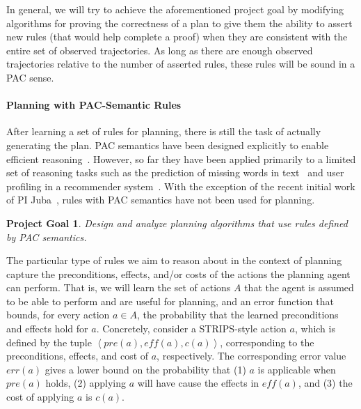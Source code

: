 \documentclass[12pt]{article}
\newcommand{\note}[1]{\textbf{\textit{#1}}}
\newcommand{\tuple}[1]{\ensuremath{\left \langle #1 \right \rangle }}
\newcommand{\eff}{\textit{eff}}
\newcommand{\pre}{\textit{pre}}
\newtheorem{problem}{Project Goal}
\begin{document}
In general, we will try to achieve the aforementioned project goal by modifying algorithms for proving the correctness of a plan to give them the ability to assert new rules (that would help complete a proof) when they are consistent with the entire set of observed trajectories. As long as there are enough observed trajectories relative to the number of asserted rules, these rules will be sound in a PAC sense. 




\paragraph{Planning with PAC-Semantic Rules}


After learning a set of rules for planning, there is still the task of actually generating the plan. PAC semantics have been designed explicitly to enable efficient reasoning~\cite{valiant2000robustLogics}. However, so far they have been applied primarily to a limited set of reasoning tasks such as the prediction of missing words in text~\cite{michael2008first} and user profiling in a recommender system~\cite{semeraro2009knowledge}. With the exception of the recent initial work of PI Juba~\cite{juba2016jmlr}, rules with PAC semantics have not been used for planning. %
\begin{problem}
Design and analyze planning algorithms that use rules defined by PAC semantics.
\end{problem}



The particular type of rules we aim to reason about in the context of planning capture the preconditions, effects, and/or costs of the actions the planning agent can perform. 
That is, we will learn the set of actions $A$ that the agent is assumed to be able to perform and are useful for planning, 
and an error function that bounds, for every action $a\in A$, 
the probability that the learned preconditions and effects hold for $a$.
Concretely, consider a STRIPS-style action $a$, which is defined by the tuple $\tuple{\pre(a), \eff(a), c(a)}$, corresponding to the preconditions, effects, and cost of $a$, respectively. The corresponding error value $err(a)$ gives a lower bound on the probability that (1) $a$ is applicable when $\pre(a)$ holds, (2) applying $a$ will have cause the effects in $\eff(a)$, and (3) the cost of applying $a$ is $c(a)$. 
\end{document}
